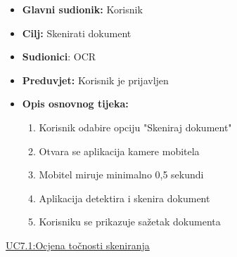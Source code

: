 \documentclass{article} %
\begin{document}
\begin{itemize}
	\item \textbf{Glavni sudionik:} Korisnik
	
	
	\item \textbf{Cilj:} Skenirati dokument
	
	
	\item \textbf{Sudionici}: OCR
	
	
	\item \textbf{Preduvjet:} Korisnik je prijavljen
	
	
	\item \textbf{Opis osnovnog tijeka:} 
	\begin{enumerate}
		\item Korisnik odabire opciju "Skeniraj dokument"
		
		
		\item Otvara se aplikacija kamere mobitela
		
		
		\item Mobitel miruje minimalno 0,5 sekundi
		
		\item Aplikacija detektira i skenira dokument
		
		\item Korisniku se prikazuje sažetak dokumenta
		
	\end{enumerate}

\end{itemize}



\noindent\underline{UC7.1:Ocjena točnosti skeniranja}
\end{document}
